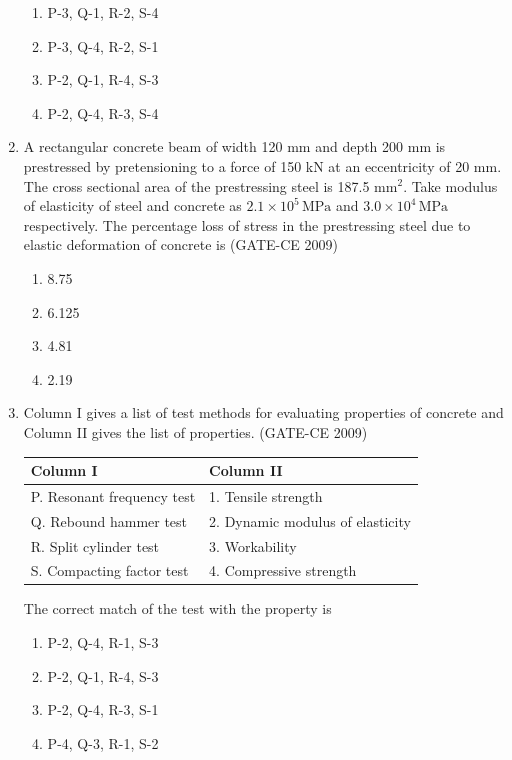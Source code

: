 \documentclass[journal,12pt,onecolumn]{article}
\theoremstyle{remark}
\begin{document}
\begin{enumerate}
    \begin{enumerate}
        \item P-3, Q-1, R-2, S-4 
        \item P-3, Q-4, R-2, S-1 
        \item P-2, Q-1, R-4, S-3 
        \item P-2, Q-4, R-3, S-4
    \end{enumerate}
    
    \item A rectangular concrete beam of width 120 mm and depth 200 mm is prestressed by pretensioning to a force of 150 kN at an eccentricity of 20 mm. The cross sectional area of the prestressing steel is 187.5 mm$^2$. Take modulus of elasticity of steel and concrete as $2.1 \times 10^5\, \text{MPa}$ and $3.0 \times 10^4\, \text{MPa}$ respectively. The percentage loss of stress in the prestressing steel due to elastic deformation of concrete is (GATE-CE 2009)
    \begin{multicols}{2}
    \begin{enumerate}
        \item 8.75 
        \item 6.125 
        \item 4.81 
        \item 2.19
    \end{enumerate}
\end{multicols}
    
    \item Column I gives a list of test methods for evaluating properties of concrete and Column II gives the list of properties. (GATE-CE 2009)
    \begin{center}
    \begin{tabular}{|l|l|}
    \hline
    \textbf{Column I} & \textbf{Column II} \\
    \hline
    P. Resonant frequency test & 1. Tensile strength \\
    Q. Rebound hammer test & 2. Dynamic modulus of elasticity \\
    R. Split cylinder test & 3. Workability \\
    S. Compacting factor test & 4. Compressive strength \\
    \hline
    \end{tabular}
    \end{center}
    The correct match of the test with the property is
    \begin{enumerate}
        \item P-2, Q-4, R-1, S-3 
        \item P-2, Q-1, R-4, S-3 
        \item P-2, Q-4, R-3, S-1 
        \item P-4, Q-3, R-1, S-2
    \end{enumerate}
    

\end{enumerate}
\end{document}
